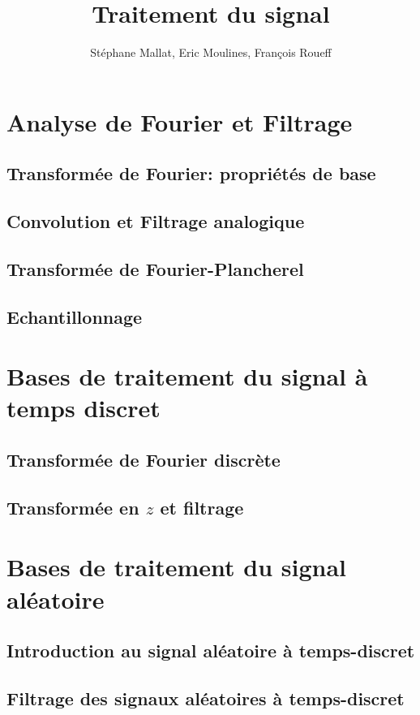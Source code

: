 \documentclass[graybox,envcountchap,envcountsame,sectrefs]{svmono}
\title{Traitement du signal}
\author{St\'ephane Mallat, Eric Moulines, François Roueff}
\begin{document}
\maketitle
\tableofcontents
\part{Analyse de Fourier et Filtrage}
\chapter{Transformée de Fourier: propriétés de base}


\chapter{Convolution et Filtrage analogique}

\chapter{Transformée de Fourier-Plancherel}

\chapter{Echantillonnage}

\part{Bases de traitement du signal à temps discret}
\chapter{Transformée de Fourier discrète}
\label{discret-chap}

\chapter{Transformée en $z$ et filtrage}

\part{Bases de traitement du signal al\'eatoire}
\chapter{Introduction au signal al\'eatoire \`a temps-discret}


\chapter{Filtrage des signaux al\'eatoires \`a temps-discret}

\end{document}
